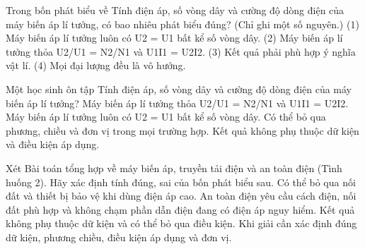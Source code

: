 \begin{ex}
Trong bốn phát biểu về Tính điện áp, số vòng dây và cường độ dòng điện của máy biến áp lí tưởng, có bao nhiêu phát biểu đúng? (Chỉ ghi một số nguyên.) (1) Máy biến áp lí tưởng luôn có U2 = U1 bất kể số vòng dây. (2) Máy biến áp lí tưởng thỏa U2/U1 = N2/N1 và U1I1 = U2I2. (3) Kết quả phải phù hợp ý nghĩa vật lí. (4) Mọi đại lượng đều là vô hướng.
\end{ex}

\begin{ex}
Một học sinh ôn tập Tính điện áp, số vòng dây và cường độ dòng điện của máy biến áp lí tưởng?
\choice
{\True Máy biến áp lí tưởng thỏa U2/U1 = N2/N1 và U1I1 = U2I2.}
{Máy biến áp lí tưởng luôn có U2 = U1 bất kể số vòng dây.}
{Có thể bỏ qua phương, chiều và đơn vị trong mọi trường hợp.}
{Kết quả không phụ thuộc dữ kiện và điều kiện áp dụng.}
\end{ex}

\begin{ex}
Xét Bài toán tổng hợp về máy biến áp, truyền tải điện và an toàn điện (Tình huống 2). Hãy xác định tính đúng, sai của bốn phát biểu sau.
\choiceTF
{Có thể bỏ qua nối đất và thiết bị bảo vệ khi dùng điện áp cao.}
{\True An toàn điện yêu cầu cách điện, nối đất phù hợp và không chạm phần dẫn điện đang có điện áp nguy hiểm.}
{Kết quả không phụ thuộc dữ kiện và có thể bỏ qua điều kiện.}
{\True Khi giải cần xác định đúng dữ kiện, phương chiều, điều kiện áp dụng và đơn vị.}
\end{ex}

